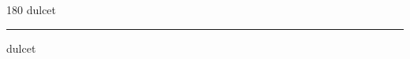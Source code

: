 
\begin{frame}
\begin{center}
\begin{turn}{180}
{\fontsize{2.5cm}{1em}\selectfont dulcet}
\end{turn}
\vspace{1em}\par  
\hrule
\vspace{1em}\par  
{\fontsize{2.5cm}{1em}\selectfont dulcet}
\end{center}
\end{frame}
